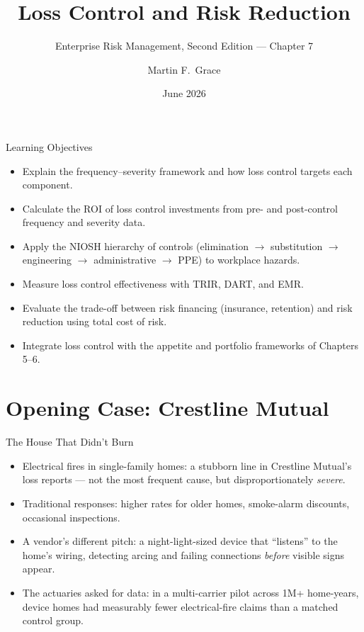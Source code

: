 \documentclass[11pt, aspectratio=169]{beamer}
\title[ERM Ch.\,7]{Loss Control and Risk Reduction}
\subtitle{Enterprise Risk Management, Second Edition --- Chapter 7}
\author{Martin F.\ Grace}
\institute{University of Iowa\\[2pt] Tippie College of Business\\[2pt] Vaughan Institute of Risk Management}
\date{June 2026}
\begin{document}
\begin{frame}[plain]
\titlepage
\end{frame}

\begin{frame}{Learning Objectives}
\begin{itemize}
  \item Explain the \alert{frequency--severity} framework and how loss control targets each component.
  \item Calculate the ROI of loss control investments from pre- and post-control frequency and severity data.
  \item Apply the NIOSH \alert{hierarchy of controls} (elimination $\rightarrow$ substitution $\rightarrow$ engineering $\rightarrow$ administrative $\rightarrow$ PPE) to workplace hazards.
  \item Measure loss control effectiveness with TRIR, DART, and EMR.
  \item Evaluate the trade-off between risk financing (insurance, retention) and risk reduction using total cost of risk.
  \item Integrate loss control with the appetite and portfolio frameworks of Chapters 5--6.
\end{itemize}
\end{frame}

\section{Opening Case: Crestline Mutual}

\begin{frame}{The House That Didn't Burn}
\begin{itemize}
  \item Electrical fires in single-family homes: a stubborn line in Crestline Mutual's loss reports --- not the most frequent cause, but disproportionately \emph{severe}.
  \item Traditional responses: higher rates for older homes, smoke-alarm discounts, occasional inspections.
  \item A vendor's different pitch: a night-light-sized device that ``listens'' to the home's wiring, detecting arcing and failing connections \emph{before} visible signs appear.
  \item The actuaries asked for data: in a multi-carrier pilot across 1M+ home-years, device homes had measurably fewer electrical-fire claims than a matched control group.
\end{itemize}
\end{frame}
\end{document}
